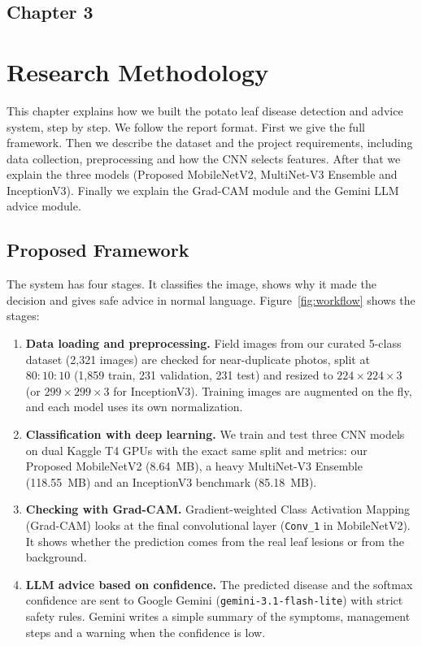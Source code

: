 \begin{center}
    \section*{\fontsize{20}{20}\selectfont Chapter 3}
\end{center}
\vspace{10mm}
\section{Research Methodology}

This chapter explains how we built the potato leaf disease detection and advice system, step by step. We follow the report format. First we give the full framework. Then we describe the dataset and the project requirements, including data collection, preprocessing and how the CNN selects features. After that we explain the three models (Proposed MobileNetV2, MultiNet-V3 Ensemble and InceptionV3). Finally we explain the Grad-CAM module and the Gemini LLM advice module.

\subsection{Proposed Framework}
The system has four stages. It classifies the image, shows why it made the decision and gives safe advice in normal language. Figure~\ref{fig:workflow} shows the stages:
\begin{enumerate}
    \item \textbf{Data loading and preprocessing.} Field images from our curated 5-class dataset (2,321 images) are checked for near-duplicate photos, split at $80:10:10$ (1,859 train, 231 validation, 231 test) and resized to $224 \times 224 \times 3$ (or $299 \times 299 \times 3$ for InceptionV3). Training images are augmented on the fly, and each model uses its own normalization.
    \item \textbf{Classification with deep learning.} We train and test three CNN models on dual Kaggle T4 GPUs with the exact same split and metrics: our Proposed MobileNetV2 (8.64~MB), a heavy MultiNet-V3 Ensemble (118.55~MB) and an InceptionV3 benchmark (85.18~MB).
    \item \textbf{Checking with Grad-CAM.} Gradient-weighted Class Activation Mapping (Grad-CAM) looks at the final convolutional layer (\texttt{Conv\_1} in MobileNetV2). It shows whether the prediction comes from the real leaf lesions or from the background.
    \item \textbf{LLM advice based on confidence.} The predicted disease and the softmax confidence are sent to Google Gemini (\texttt{gemini-3.1-flash-lite}) with strict safety rules. Gemini writes a simple summary of the symptoms, management steps and a warning when the confidence is low.
\end{enumerate}

